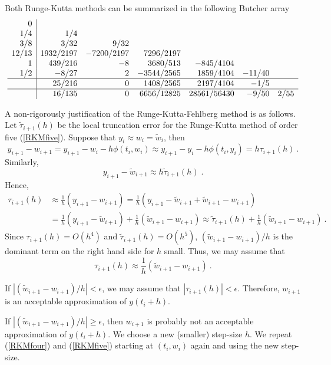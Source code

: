 Both Runge-Kutta methods can be summarized in the following Butcher
array
\[
\begin{array}{r|rrrrrr}
0 & & & & & & \\
1/4 & 1/4 & & & & & \\
3/8 & 3/32 & 9/32 & & & & \\
12/13 & 1932/2197 &
-7200/2197 & 7296/2197 & & & \\
1 & 439/216 & -8 & 3680/513 & -845/4104 & & \\
1/2 & -8/27 & 2 & -3544/2565 & 1859/4104 & -11/40 & \\
\hline
 & 25/216 & 0 & 1408/2565 & 2197/4104 & -1/5 & \\
\hline
 & 16/135 & 0 & 6656/12825 & 28561/56430 & -9/50 & 2/55
\end{array}
\]

\begin{rmk}
A non-rigorously justification of the Runge-Kutta-Fehlberg method is
as follows.  Let $\tilde{\tau}_{i+1}(h)$ be the local truncation error
for the Runge-Kutta method of order five (\ref{RKMfive}).  Suppose
that $y_i \approx w_i = \tilde{w}_i$, then
\[
y_{i+1} - w_{i+1} = y_{i+1} - w_i -h \phi(t_i,w_i)
\approx y_{i+1} - y_i - h \phi(t_i,y_i) = h \tau_{i+1}(h) \ .
\]
Similarly,
\[
y_{i+1} - \tilde{w}_{i+1} \approx h \tilde{\tau}_{i+1}(h) \;  .
\]
Hence,
\begin{align*}
\tau_{i+1}(h) &\approx \frac{1}{h} \left(y_{i+1} - w_{i+1} \right)
= \frac{1}{h}\left(y_{i+1} - \tilde{w}_{i+1} + \tilde{w}_{i+1} -
 w_{i+1} \right) \\
&= \frac{1}{h}\left(y_{i+1} - \tilde{w}_{i+1}\right) +
 \frac{1}{h}\left( \tilde{w}_{i+1} - w_{i+1} \right)
\approx \tilde{\tau}_{i+1}(h) +
 \frac{1}{h}\left( \tilde{w}_{i+1} -w_{i+1} \right) \ .
\end{align*}
Since $\tau_{i+1}(h) = O(h^4)$ and $\tilde{\tau}_{i+1}(h) = O(h^5)$,
$(\tilde{w}_{i+1} - w_{i+1})/h$ is the dominant term on the right hand
side for $h$ small.  Thus, we may assume that
\begin{equation} \label{approx_tau}
\tau_{i+1}(h) \approx \frac{1}{h}\left( \tilde{w}_{i+1} - w_{i+1}
\right) \ .
\end{equation}

If $\left|(\tilde{w}_{i+1} - w_{i+1})/h\right| < \epsilon$, we may
assume that $|\tau_{i+1}(h)| < \epsilon$.  Therefore, $w_{i+1}$ is an
acceptable approximation of $y(t_i+h)$.

If $\left|(\tilde{w}_{i+1} - w_{i+1})/h\right| \geq \epsilon$, then
$w_{i+1}$ is probably not an acceptable approximation of $y(t_i+h)$.
We choose a new (smaller) step-size $h$.  We repeat (\ref{RKMfour}) and
(\ref{RKMfive}) starting at $(t_i,w_i)$ again and using the new
step-size.


\end{rmk}
